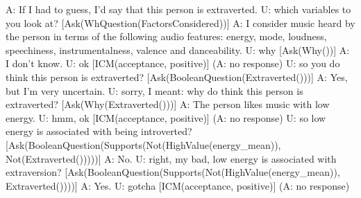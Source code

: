 
\begin{dialogexample}
A: If I had to guess, I'd say that this person is extraverted.
U: which variables to you look at?
  [Ask(WhQuestion(FactorsConsidered))]
A: I consider music heard by the person in terms of the following audio features: energy, mode, loudness, speechiness, instrumentalness, valence and danceability.
U: why
  [Ask(Why())]
A: I don't know.
U: ok
  [ICM(acceptance, positive)]
(A: no response)
U: so you do think this person is extraverted?
  [Ask(BooleanQuestion(Extraverted()))]
A: Yes, but I'm very uncertain.
U: sorry, I meant: why  do think this person is extraverted?
  [Ask(Why(Extraverted()))]
A: The person likes music with low energy.
U: hmm, ok
  [ICM(acceptance, positive)]
(A: no response)
U: so low energy is associated with being introverted?
  [Ask(BooleanQuestion(Supports(Not(HighValue(energy_mean)), Not(Extraverted()))))]
A: No.
U: right, my bad, low energy is associated with extraversion?
  [Ask(BooleanQuestion(Supports(Not(HighValue(energy_mean)), Extraverted())))]
A: Yes.
U: gotcha
  [ICM(acceptance, positive)]
(A: no response)
\end{dialogexample}
